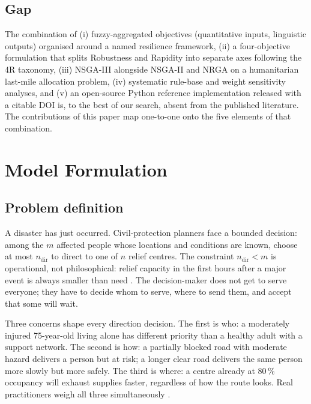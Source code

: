 \documentclass[applsci,article,submit,moreauthors,pdftex]{Definitions/mdpi}
\begin{document}
\subsection{Gap}\label{sec:related-gap}

The combination of (i) fuzzy-aggregated objectives (quantitative inputs,
linguistic outputs) organised around a named resilience framework, (ii) a
four-objective formulation that
splits Robustness and Rapidity into separate axes following the 4R
taxonomy, (iii) NSGA-III alongside NSGA-II and NRGA on a humanitarian
last-mile allocation problem, (iv) systematic rule-base and weight
sensitivity analyses, and (v) an open-source Python reference
implementation released with a citable DOI is, to the best of our search,
absent from the published literature. The contributions of this paper map
one-to-one onto the five elements of that combination.

\section{Model Formulation}\label{sec:model}

\subsection{Problem definition}\label{sec:model-def}

A disaster has just occurred. Civil-protection planners face a bounded
decision: among the $m$ affected people whose locations and conditions are
known, choose at most $n_{\mathrm{dir}}$ to direct to one of $n$ relief centres.
The constraint $n_{\mathrm{dir}} < m$ is operational, not
philosophical: relief capacity in the first hours after a major event is
always smaller than need \cite{cred2023, krishna2021}. The decision-maker does
not get to serve everyone; they have to decide whom to serve, where to send
them, and accept that some will wait.

Three concerns shape every direction decision. The first is who: a moderately
injured 75-year-old living alone has different priority than a healthy adult
with a support network. The second is how: a partially blocked road with
moderate hazard delivers a person but at risk; a longer clear road delivers
the same person more slowly but more safely. The third is where: a centre
already at 80\,\% occupancy will exhaust supplies faster, regardless of how
the route looks. Real practitioners weigh all three simultaneously
\cite{behl2019}.
\end{document}
